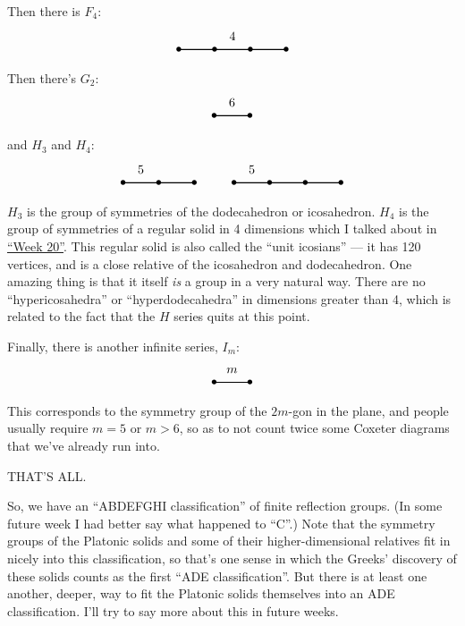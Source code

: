 \documentclass{article}
\begin{document}
Then there is \(F_4\): \[
  \begin{tikzpicture}
    \draw[thick] (0,0) node{$\bullet$} to (1,0) node{$\bullet$} to node[label=above:{4}]{} (2,0) node{$\bullet$} to (3,0) node {$\bullet$};
  \end{tikzpicture}
\] Then there's \(G_2\): \[
  \begin{tikzpicture}
    \draw[thick] (0,0) node{$\bullet$} to node[label=above:{6}]{} (1,0) node{$\bullet$};
  \end{tikzpicture}
\] and \(H_3\) and \(H_4\): \[
  \begin{tikzpicture}
    \draw[thick] (0,0) node{$\bullet$} to node[label=above:{5}]{} (1,0) node{$\bullet$} to (2,0) node{$\bullet$};
  \end{tikzpicture}
  \qquad
  \begin{tikzpicture}
  \draw[thick] (0,0) node{$\bullet$} to node[label=above:{5}]{} (1,0) node{$\bullet$} to (2,0) node{$\bullet$} to (3,0) node {$\bullet$};
\end{tikzpicture}
\] \(H_3\) is the group of symmetries of the dodecahedron or
icosahedron. \(H_4\) is the group of symmetries of a regular solid in 4
dimensions which I talked about in \protect\hyperlink{week20}{``Week
20''}. This regular solid is also called the ``unit icosians'' --- it
has 120 vertices, and is a close relative of the icosahedron and
dodecahedron. One amazing thing is that it itself \emph{is} a group in a
very natural way. There are no ``hypericosahedra'' or
``hyperdodecahedra'' in dimensions greater than 4, which is related to
the fact that the \(H\) series quits at this point.

Finally, there is another infinite series, \(I_m\): \[
  \begin{tikzpicture}
    \draw[thick] (0,0) node{$\bullet$} to node[label=above:{$m$}]{} (1,0) node{$\bullet$};
  \end{tikzpicture}
\] This corresponds to the symmetry group of the \(2m\)-gon in the
plane, and people usually require \(m = 5\) or \(m > 6\), so as to not
count twice some Coxeter diagrams that we've already run into.

THAT'S ALL.

So, we have an ``ABDEFGHI classification'' of finite reflection groups.
(In some future week I had better say what happened to ``C''.) Note that
the symmetry groups of the Platonic solids and some of their
higher-dimensional relatives fit in nicely into this classification, so
that's one sense in which the Greeks' discovery of these solids counts
as the first ``ADE classification''. But there is at least one another,
deeper, way to fit the Platonic solids themselves into an ADE
classification. I'll try to say more about this in future weeks.
\end{document}
